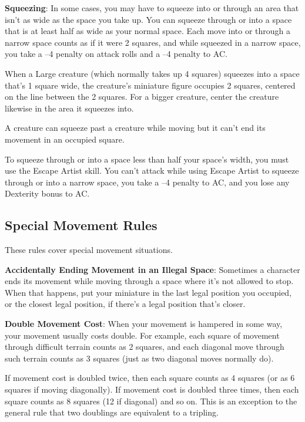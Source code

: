 \textbf{Squeezing}: In some cases, you may have to squeeze into or through an area that isn't as wide as the space you take up. You can squeeze through or into a space that is at least half as wide as your normal space. Each move into or through a narrow space counts as if it were 2 squares, and while squeezed in a narrow space, you take a --4 penalty on attack rolls and a --4 penalty to AC.
				
When a Large creature (which normally takes up 4 squares) squeezes into a space that's 1 square wide, the creature's miniature figure occupies 2 squares, centered on the line between the 2 squares. For a bigger creature, center the creature likewise in the area it squeezes into.
				
A creature can squeeze past a creature while moving but it can't end its movement in an occupied square.
				
To squeeze through or into a space less than half your space's width, you must use the Escape Artist skill. You can't attack while using Escape Artist to squeeze through or into a narrow space, you take a --4 penalty to AC, and you lose any Dexterity bonus to AC.
				
\subsection{Special Movement Rules}

				
These rules cover special movement situations.
				
\textbf{Accidentally Ending Movement in an Illegal Space}: Sometimes a character ends its movement while moving through a space where it's not allowed to stop. When that happens, put your miniature in the last legal position you occupied, or the closest legal position, if there's a legal position that's closer.
				
\textbf{Double Movement Cost}: When your movement is hampered in some way, your movement usually costs double. For example, each square of movement through difficult terrain counts as 2 squares, and each diagonal move through such terrain counts as 3 squares (just as two diagonal moves normally do).
				
If movement cost is doubled twice, then each square counts as 4 squares (or as 6 squares if moving diagonally). If movement cost is doubled three times, then each square counts as 8 squares (12 if diagonal) and so on. This is an exception to the general rule that two doublings are equivalent to a tripling.
				
